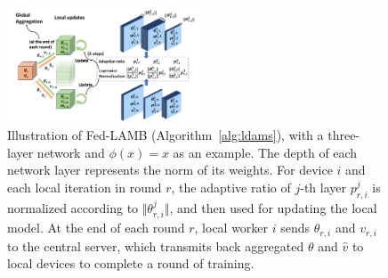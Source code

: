 \documentclass{article}
\begin{document}
\begin{figure}[H]
    \begin{center}
        \includegraphics[width=0.51\textwidth]{plot/plot1.pdf}
    \end{center}
    \vspace{-0.1in}
	\caption{Illustration of Fed-LAMB (Algorithm~\ref{alg:ldams}), with a three-layer network and $\phi(x)=x$ as an example. The depth of each network layer represents the norm of its weights. For device $i$ and each local iteration in round $r$, the adaptive ratio of $j$-th layer $p_{r,i}^j$ is normalized according to $\Vert \theta_{r,i}^j\Vert$, and then used for updating the local model. At the end of each round $r$, local worker $i$ sends $\theta_{r,i}$ and $v_{r,i}$ to the central server, which transmits back aggregated $\theta$ and $\hat v$ to local devices to complete a round of training.}
	\label{fig:illustrate}
\end{figure}
\end{document}
